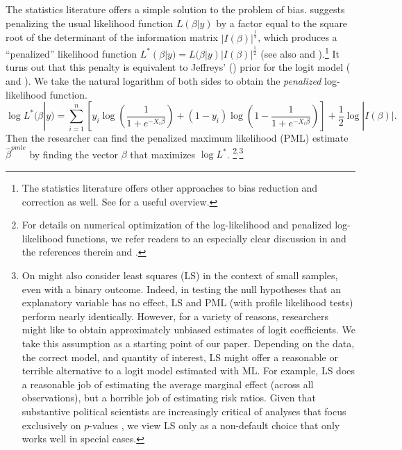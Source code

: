 \documentclass[12pt]{article}
\begin{document}
The statistics literature offers a simple solution to the problem of bias.
\cite{Firth1993} suggests penalizing the usual likelihood function $L(\beta | y)$ by a factor equal to the square root of the determinant of the information matrix $|I(\beta)|^\frac{1}{2}$, which produces a ``penalized'' likelihood function $L^*(\beta | y) = L(\beta | y)|I(\beta)|^\frac{1}{2}$ (see also \citealt{KosmidisFirth2009} and \citealt{Kosmidis2014}).\footnote{The statistics literature offers other approaches to bias reduction and correction as well. 
See \cite{Kosmidis2014} for a useful overview.}
It turns out that this penalty is equivalent to Jeffreys' (\citeyear{Jeffreys1946}) prior for the logit model (\citealt{Firth1993} and \citealt{Poirier1994}).
We take the natural logarithm of both sides to obtain the \textit{penalized} log-likelihood function.
\begin{equation}\nonumber
\log L^*(\beta | y) = \displaystyle \sum_{i = 1}^n \left[y_i \log \left( \dfrac{1}{1 + e^{-X_i\beta}}\right) + (1 - y_i) \log \left(1 - \dfrac{1}{1 + e^{-X_i\beta}}\right)\right] + \dfrac{1}{2} \log |I(\beta)|.
\end{equation}
Then the researcher can find the penalized maximum likelihood (PML) estimate $\hat{\beta}^{pmle}$ by finding the vector $\beta$ that maximizes $\log L^*$.
\footnote{For details on numerical optimization of the log-likelihood and penalized log-likelihood functions, we refer readers to an especially clear discussion in \citet[ch. 5]{Gill2000} and the references therein and \citet[p. 799]{KosmidisFirth2009}.}$^,$\footnote{On might also consider least squares (LS) in the context of small samples, even with a binary outcome. Indeed, in testing the null hypotheses that an explanatory variable has no effect, LS and PML (with profile likelihood tests) perform nearly identically. However, for a variety of reasons, researchers might like to obtain approximately unbiased estimates of logit coefficients. We take this assumption as a starting point of our paper. Depending on the data, the correct model, and quantity of interest, LS might offer a reasonable or terrible alternative to a logit model estimated with ML. For example, LS does a reasonable job of estimating the average marginal effect (across all observations), but a horrible job of estimating risk ratios. Given that substantive political scientists are increasingly critical of analyses that focus exclusively on $p$-values \citep{KingTomzWittenberg2000, Rainey2014a, Gross2015, McCaskeyRainey2015}, we view LS only as a non-default choice that only works well in special cases.}
\end{document}
